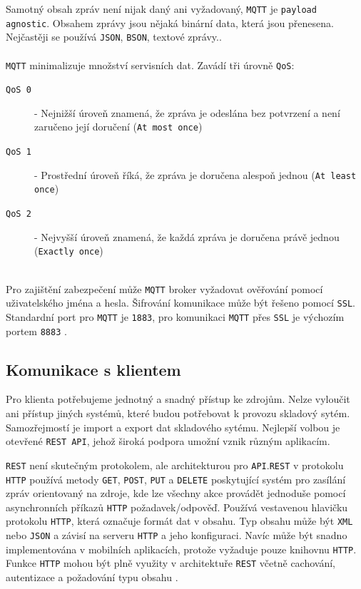 \documentclass[czech,BP]{thesiskiv}
\begin{document}
Samotný obsah zpráv není nijak daný ani vyžadovaný, \texttt{MQTT} je \texttt{payload agnostic}. Obsahem zprávy jsou nějaká binární data, která jsou přenesena. Nejčastěji se používá \texttt{JSON}, \texttt{BSON}, textové zprávy.\cite{maly2016mqtt}.
\\\\  
\texttt{MQTT} minimalizuje množství servisních dat. Zavádí tři úrovně \texttt{QoS}:
\begin{description}
\item [\texttt{QoS 0}] - Nejnižší úroveň znamená, že zpráva je odeslána bez potvrzení a není zaručeno její doručení (\texttt{At most once})
\item [\texttt{QoS 1}] - Prostřední úroveň říká, že zpráva je doručena alespoň jednou (\texttt{At least once})
\item [\texttt{QoS 2}] - Nejvyšší úroveň znamená, že každá zpráva je doručena právě jednou (\texttt{Exactly once})
\end{description}
\ \\
Pro zajištění zabezpečení může \texttt{MQTT} broker vyžadovat ověřování pomocí uživatelského jména a hesla. Šifrování komunikace může být řešeno pomocí \texttt{SSL}. 
Standardní port pro \texttt{MQTT} je \texttt{1883}, pro komunikaci \texttt{MQTT} přes \texttt{SSL} je výchozím portem \texttt{8883} \cite{karagiannis2015survey}.
			

		\subsection{Komunikace s klientem}
			Pro klienta potřebujeme jednotný a snadný přístup ke zdrojům. Nelze vyloučit ani přístup jiných systémů, které budou potřebovat k provozu skladový sytém. Samozřejmostí je import a export dat skladového sytému. Nejlepší volbou je otevřené \texttt{REST API}, jehož široká podpora umožní vznik různým aplikacím.


		
		\texttt{REST} není skutečným protokolem, ale architekturou pro \texttt{API}.\texttt{REST} v protokolu \texttt{HTTP} používá metody \texttt{GET}, \texttt{POST}, \texttt{PUT} a \texttt{DELETE} poskytující systém pro zasílání zpráv orientovaný na zdroje, kde lze všechny akce provádět jednoduše pomocí asynchronních příkazů \texttt{HTTP} požadavek/odpověď. Používá vestavenou hlavičku protokolu \texttt{HTTP}, která označuje formát dat v obsahu. Typ obsahu může být \texttt{XML} nebo \texttt{JSON} a závisí na serveru \texttt{HTTP} a jeho konfiguraci. Navíc může být snadno implementována v mobilních aplikacích, protože vyžaduje pouze knihovnu \texttt{HTTP}. Funkce \texttt{HTTP} mohou být plně využity v architektuře \texttt{REST} včetně cachování, autentizace a požadování typu obsahu \cite{karagiannis2015survey}.
		 
\end{document}
